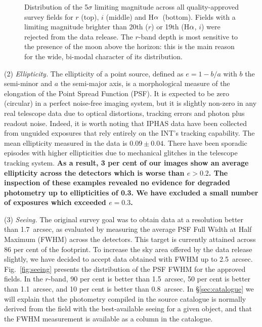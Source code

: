 \documentclass[a4paper,useAMS,usenatbib]{mn2e}
\def\ha{\mbox{H$\rm \alpha$}}
\begin{document}
\begin{figure}
\begin{minipage}[b]{\linewidth}
    \end{minipage}
    \caption{Distribution of the 5$\sigma$ limiting magnitude
             across all quality-approved survey fields
             for $r$ (top), $i$ (middle) and \ha\ (bottom).
             Fields with a limiting magnitude brighter than
             20th ($r$) or 19th (\ha, $i$) were rejected
             from the data release.
             The $r$-band depth is most sensitive 
             to the presence of the moon above the horizon: 
             this is the main reason for the wide, bi-modal character
             of its distribution.}
    \label{fig:depth}
\end{figure}

(2) \emph{Ellipticity.} 
The ellipticity of a point source,
defined as $e = 1 - b / a$ 
with $b$ the semi-minor and $a$ the semi-major axis,
is a morphological measure of the elongation
of the Point Spread Function (PSF).
It is expected to be zero (circular)
in a perfect noise-free imaging system,
but it is slightly non-zero in any real telescope data 
due to optical distortions, tracking errors and photon plus readout noise.
Indeed, it is worth noting
that IPHAS data have been collected
from unguided exposures that rely entirely
on the INT's tracking capability.
The mean ellipticity measured
in the data is $0.09\pm0.04$.
There have been sporadic episodes with higher ellipticities
due to mechanical glitches in the telescope tracking system.
{ \bf As a result, 3 per cent of our images show an
average ellipticity across the detectors which is worse
than $e > 0.2$.
The inspection of these examples revealed no evidence
for degraded photometry up to ellipticities of 0.3.
We have excluded a small number of exposures
which exceeded $e = 0.3$.}

(3) \emph{Seeing.} 
The original survey goal was to obtain data 
at a resolution better than 1.7~arcsec,
as evaluated by measuring the average PSF Full Width at Half Maximum (FWHM)
across the detectors.
This target is currently attained across 86 per cent of the footprint.
To increase the sky area offered by the data release slightly,
we have decided to accept data obtained with FWHM up to 2.5~arcsec.
Fig.~\ref{fig:seeing} presents the distribution
of the PSF FWHM for the approved fields.
In the $r$-band, 90 per cent is better than 1.5~arcsec,
50 per cent is better than 1.1~arcsec,
and 10 per cent is better than 0.8~arcsec.
In \S\ref{sec:catalogue} we will explain
that the photometry compiled in the source catalogue
is normally derived from the field with the
best-available seeing for a given object,
and that the FWHM measurement
is available as a column in the catalogue.
\end{document}
